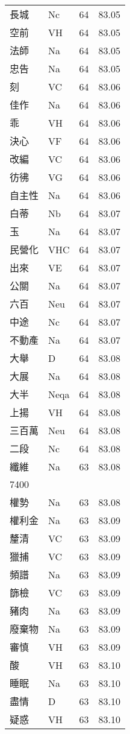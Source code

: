 \documentclass[twocolumn]{book}
\begin{document}
\begin{supertabular}{llrr}
長城 & Nc & 64 &  83.05\\
空前 & VH & 64 &  83.05\\
法師 & Na & 64 &  83.05\\
忠告 & Na & 64 &  83.05\\
刻 & VC & 64 &  83.06\\
佳作 & Na & 64 &  83.06\\
乖 & VH & 64 &  83.06\\
決心 & VF & 64 &  83.06\\
改編 & VC & 64 &  83.06\\
彷彿 & VG & 64 &  83.06\\
自主性 & Na & 64 &  83.06\\
白蒂 & Nb & 64 &  83.07\\
玉 & Na & 64 &  83.07\\
民營化 & VHC & 64 &  83.07\\
出來 & VE & 64 &  83.07\\
公關 & Na & 64 &  83.07\\
六百 & Neu & 64 &  83.07\\
中途 & Nc & 64 &  83.07\\
不動產 & Na & 64 &  83.07\\
大舉 & D & 64 &  83.08\\
大展 & Na & 64 &  83.08\\
大半 & Neqa & 64 &  83.08\\
上揚 & VH & 64 &  83.08\\
三百萬 & Neu & 64 &  83.08\\
二段 & Nc & 64 &  83.08\\
纖維 & Na & 63 &  83.08\\
7400\\
權勢 & Na & 63 &  83.08\\
權利金 & Na & 63 &  83.09\\
釐清 & VC & 63 &  83.09\\
獵捕 & VC & 63 &  83.09\\
頻譜 & Na & 63 &  83.09\\
篩檢 & VC & 63 &  83.09\\
豬肉 & Na & 63 &  83.09\\
廢棄物 & Na & 63 &  83.09\\
審慎 & VH & 63 &  83.09\\
酸 & VH & 63 &  83.10\\
睡眠 & Na & 63 &  83.10\\
盡情 & D & 63 &  83.10\\
疑惑 & VH & 63 &  83.10\\

\end{supertabular}
\end{document}
